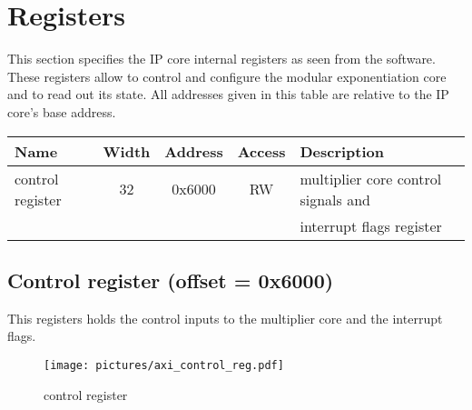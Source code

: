 \section{Registers}
This section specifies the IP core internal registers as seen from the software. These registers allow to control and
configure the modular exponentiation core and to read out its state. All addresses given in this table are relative to the
IP core's base address.\\
\newline
\begin{tabular}{|l|c|c|c|l|}
\hline
\rowcolor{Gray}
\textbf{Name} & \textbf{Width} & \textbf{Address} & \textbf{Access} & \textbf{Description} \bigstrut\\
\hline
control register 		& 32 & 0x6000 & RW 	& multiplier core control signals and \bigstrut[t]\\
						&	&		&		& interrupt flags register\bigstrut[b]\\
\hline
\end{tabular}%
\newpage
\subsection{Control register (offset = 0x6000)}
This registers holds the control inputs to the multiplier core and the interrupt flags.\\
\begin{figure}[H]
\centering
\texttt{[image: pictures/axi\_control\_reg.pdf]}
\caption{control register}
\end{figure}

